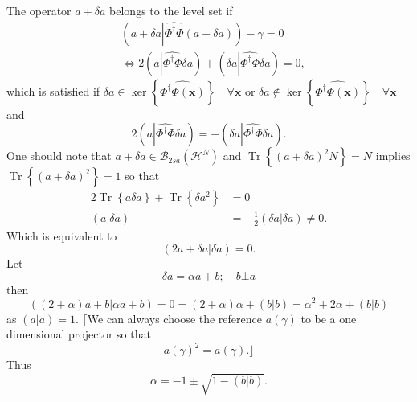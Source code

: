 \documentclass[aps,preprint]{revtex4}%
\begin{document}
The operator $a+\delta a$ belongs to the level set if
\begin{align}
&  \left(  a+\delta a\left\vert \widehat{\Phi^{\dagger}\Phi}\right.  \left(
a+\delta a\right)  \right)  -\gamma=0\\
&  \Leftrightarrow2\left(  a\left\vert \widehat{\Phi^{\dagger}\Phi}\right.
\delta a\right)  +\left(  \delta a\left\vert \widehat{\Phi^{\dagger}\Phi
}\right.  \delta a\right)  =0,
\end{align}
which is satisfied if $\delta a\in\ker\left\{  \widehat{\Phi^{\dagger}%
\Phi\left(  \mathbf{x}\right)  }\right\}  \quad\forall\mathbf{x}$ or $\delta
a\notin\ker\left\{  \widehat{\Phi^{\dagger}\Phi\left(  \mathbf{x}\right)
}\right\}  \quad\forall\mathbf{x}$ and
\begin{equation}
2\left(  a\left\vert \widehat{\Phi^{\dagger}\Phi}\right.  \delta a\right)
=-\left(  \delta a\left\vert \widehat{\Phi^{\dagger}\Phi}\right.  \delta
a\right)  .
\end{equation}
One should note that $a+\delta a\in\mathcal{B}_{2sa}\left(  \mathcal{H}%
^{N}\right)  $ and $\operatorname{Tr}\left\{  \left(  a+\delta a\right)
^{2}N\right\}  =N$ implies $\operatorname{Tr}\left\{  \left(  a+\delta
a\right)  ^{2}\right\}  =1$ so that
\begin{align}
2\operatorname{Tr}\left\{  a\delta a\right\}  +\operatorname{Tr}\left\{
\delta a^{2}\right\}   &  =0\\
\left(  a\left\vert \delta a\right.  \right)   &  =-\frac{1}{2}\left(  \delta
a\left\vert \delta a\right.  \right)  \neq0.
\end{align}
Which is equivalent to
\begin{equation}
\left(  2a+\delta a\left\vert \delta a\right.  \right)  =0.
\end{equation}
Let
\begin{equation}
\delta a=\alpha a+b;\quad b\bot a
\end{equation}
then
\begin{equation}
\left(  \left(  2+\alpha\right)  a+b\left\vert \alpha a+b\right.  \right)
=0=\left(  2+\alpha\right)  \alpha+\left(  b\left\vert b\right.  \right)
=\alpha^{2}+2\alpha+\left(  b\left\vert b\right.  \right)
\end{equation}
as $\left(  a\left\vert a\right.  \right)  =1.$ $\lceil$We can always choose
the reference $a\left(  \gamma\right)  $ to be a one dimensional projector so
that
\begin{equation}
a\left(  \gamma\right)  ^{2}=a\left(  \gamma\right)  .\rfloor
\end{equation}
Thus%
\begin{equation}
\alpha=-1\pm\sqrt{1-\left(  b\left\vert b\right.  \right)  }.
\end{equation}
\end{document}
